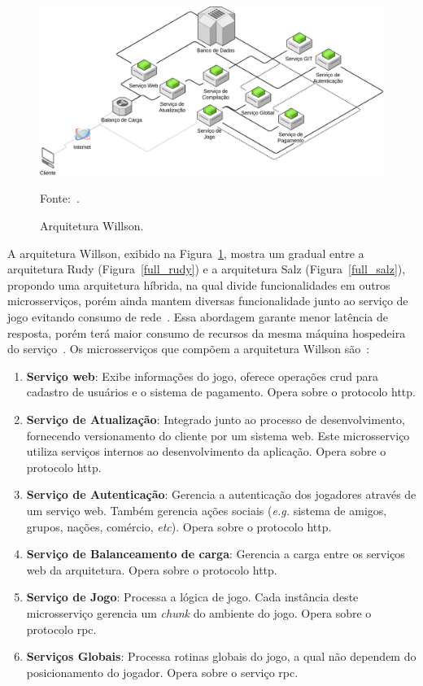 \begin{figure}[htb!]
  \caption{Arquitetura Willson.}
  \label{full_willson}
  \includegraphics[width=\textwidth]{arquiteturas/full_willson.png}
  \centering

  Fonte:~\cite{stephenclarkewillson2017}.
\end{figure}


A arquitetura Willson, exibido na Figura~\ref{full_willson}, mostra um gradual entre a arquitetura Rudy (Figura~\ref{full_rudy}) e a arquitetura Salz (Figura~\ref{full_salz}), propondo uma arquitetura híbrida, na qual divide funcionalidades em outros microsserviços, porém ainda mantem diversas funcionalidade junto ao serviço de jogo evitando consumo de rede~\cite{albion_online_unite, willson}.
%
Essa abordagem garante menor latência de resposta, porém terá maior consumo de recursos da mesma máquina hospedeira do serviço~\cite{willson}.
%
Os microsserviços que compõem a arquitetura Willson são~\cite{willson, stephenclarkewillson2017}:

\begin{enumerate}
  \item \textbf{Serviço web}: Exibe informações do jogo, oferece operações \ac{crud} para cadastro de usuários e o sistema de pagamento. Opera sobre o protocolo \ac{http}.
  \item \textbf{Serviço de Atualização}: Integrado junto ao processo de desenvolvimento, fornecendo versionamento do cliente por um sistema web. Este microsserviço utiliza serviços internos ao desenvolvimento da aplicação. Opera sobre o protocolo \ac{http}.
  \item \textbf{Serviço de Autenticação}: Gerencia a autenticação dos jogadores através de um serviço web. Também gerencia ações sociais (\textit{e.g.} sistema de amigos, grupos, nações, comércio, \textit{etc}). Opera sobre o protocolo \ac{http}.
  \item \textbf{Serviço de Balanceamento de carga}: Gerencia a carga entre os serviços web da arquitetura. Opera sobre o protocolo \ac{http}.
  \item \textbf{Serviço de Jogo}: Processa a lógica de jogo. Cada instância deste microsserviço gerencia um \textit{chunk} do ambiente do jogo. Opera sobre o protocolo \ac{rpc}.
  \item \textbf{Serviços Globais}: Processa rotinas globais do jogo, a qual não dependem do posicionamento do jogador. Opera sobre o serviço \ac{rpc}.
\end{enumerate}

